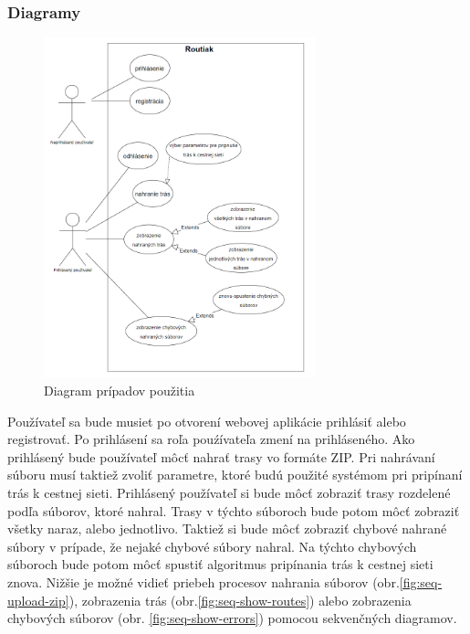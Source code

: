 \subsubsection{Diagramy}
\begin{figure}[H]
    \centering
    \includegraphics[width=0.7\textwidth]{img/diagramy/use-case.png}
    \caption{Diagram prípadov použitia}
    \label{fig:use-case}
\end{figure}
Používateľ sa bude musiet po otvorení webovej aplikácie prihlásiť alebo registrovať. Po prihlásení sa roľa pouźívateľa zmení na prihláseného. Ako prihlásený bude používateľ môcť nahrať trasy vo formáte ZIP. Pri nahrávaní súboru musí taktiež zvoliť parametre, ktoré budú použité systémom pri pripínaní trás k cestnej sieti. Prihlásený používateľ si bude môcť zobraziť trasy rozdelené podľa súborov, ktoré nahral. Trasy v týchto súboroch bude potom môcť zobraziť všetky naraz, alebo jednotlivo. Taktiež si bude môcť zobraziť chybové nahrané súbory v prípade, že nejaké chybové súbory nahral. Na týchto chybových súboroch bude potom môcť spustiť algoritmus pripínania trás k cestnej sieti znova. Nižšie je možné vidieť priebeh procesov nahrania súborov (obr.\ref{fig:seq-upload-zip}), zobrazenia trás (obr.\ref{fig:seq-show-routes}) alebo zobrazenia chybových súborov (obr. \ref{fig:seq-show-errors}) pomocou sekvenčných diagramov.
